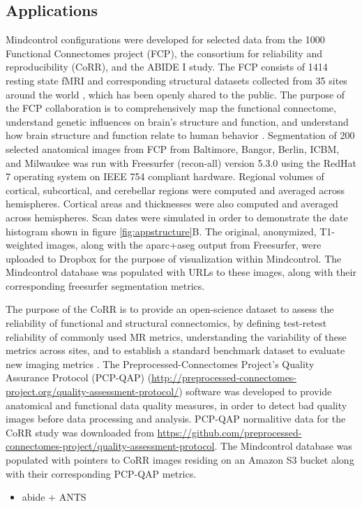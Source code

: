 \subsection{Applications}

Mindcontrol configurations were developed for selected data from the 1000 Functional Connectomes project (FCP), the consortium for reliability and reproducibility (CoRR), and the ABIDE I study. The FCP consists of 1414 resting state fMRI and corresponding structural datasets collected from 35 sites around the world  \cite{biswal2010toward}, which has been openly shared to the public. The purpose of the FCP collaboration is to comprehensively map the functional connectome, understand genetic influences on brain's structure and function, and understand how brain structure and function relate to human behavior \cite{biswal2010toward}. Segmentation of 200 selected anatomical images from FCP from Baltimore, Bangor, Berlin, ICBM, and Milwaukee was run with Freesurfer (recon-all) version 5.3.0 \cite{fischl2002whole} using the RedHat 7 operating system on IEEE 754 compliant hardware. Regional volumes of cortical, subcortical, and cerebellar regions were computed and averaged across hemispheres. Cortical areas and thicknesses were also computed and averaged across hemispheres. Scan dates were simulated in order to demonstrate the date histogram shown in figure \ref{fig:appstructure}B. The original, anonymized, T1-weighted images, along with the aparc+aseg output from Freesurfer, were uploaded to Dropbox for the purpose of visualization within Mindcontrol. The Mindcontrol database was populated with URLs to these images, along with their corresponding freesurfer segmentation metrics.

The purpose of the CoRR is to provide an open-science dataset to assess the reliability of functional and structural connectomics, by defining test-retest reliability of commonly used MR metrics, understanding the variability of these metrics across sites, and to establish a standard benchmark dataset to evaluate new imaging metrics \cite{Zuo_2014}. The Preprocessed-Connectomes Project's Quality Assurance Protocol (PCP-QAP) (\href{http://preprocessed-connectomes-project.org/quality-assessment-protocol/}{http://preprocessed-connectomes-project.org/quality-assessment-protocol/}) software was developed to provide anatomical and functional data quality measures, in order to detect bad quality images before data processing and analysis. PCP-QAP normalitive data for the CoRR study was downloaded from \href{http://raw.githubusercontent.com/preprocessed-connectomes-project/quality-assessment-protocol/master/poster_data/corr_anat.csv}{https://github.com/preprocessed-connectomes-project/quality-assessment-protocol}. The Mindcontrol database was populated with pointers to CoRR images residing on an Amazon S3 bucket along with their corresponding PCP-QAP metrics.




\begin{itemize}
\item abide + ANTS
\end{itemize}